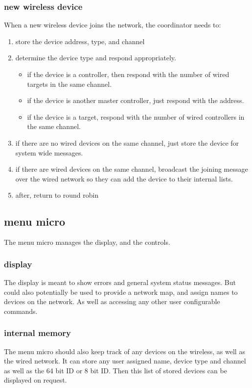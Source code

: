 \documentclass{article}
\begin{document}
     \subsubsection{new wireless device}
     When a new wireless device joins the network, the coordinator needs to:
     \begin{enumerate}
     	\item store the device address, type, and channel
     	\item determine the device type and respond appropriately.
     	\begin{itemize}
     		\item if the device is a controller, then respond with the number of wired targets in the same channel.
     		\item if the device is another master controller, just respond with the address.
     		\item if the device is a target, respond with the number of wired controllers in the same channel.
     	\end{itemize}
     	\item if there are no wired devices on the same channel, just store the device for system wide messages.
     	
     	\item if there are wired devices on the same channel, broadcast the joining message over the wired network so they can add the device to their internal lists.
     	
     	\item after, return to round robin
     \end{enumerate}
     \subsection{menu micro}
     The menu micro manages the display, and the controls.
     \subsubsection{display}
     The display is meant to show errors and general system status messages.
     But could also potentially be used to provide a network map,
      and assign names to devices on the network.
      As well as accessing any other user configurable commands.
     
     \subsubsection{internal memory}
     The menu micro should also keep track of any devices on the wireless, as well as the wired network.
     It can store any user assigned name, device type and channel as well as the 64 bit ID or 8 bit ID.
     Then this list of stored devices can be displayed on request.
     
\end{document}
